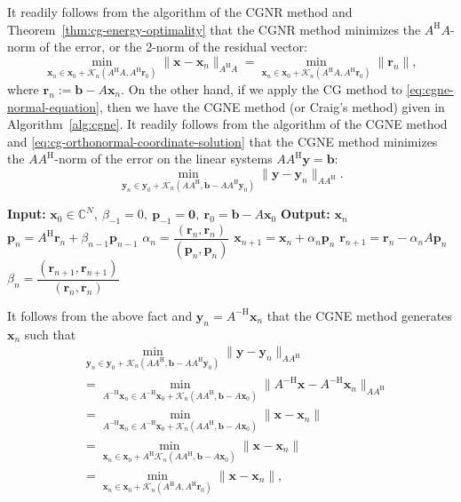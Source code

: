 {It readily follows from the algorithm of the CGNR method and Theorem\ \ref{thm:cg-energy-optimality} that the CGNR method minimizes the $A^{\mathrm H}A$-norm of the error, or the 2-norm of the residual vector:}
\[\min_{\bm x_n\in\bm x_0+\mathcal K_n(A^{\mathrm H}A,A^{\mathrm H}\bm r_0)}\|\bm x-\bm x_n\|_{A^{\mathrm H}A}=\min_{\bm x_n\in\bm x_0+\mathcal K_n(A^{\mathrm H}A,A^{\mathrm H}\bm r_0)}\|\bm r_n\|,\]
{where $\bm r_n:=\bm b-A\bm x_n$.}
{On the other hand, if we apply the CG method to \eqref{eq:cgne-normal-equation}, then we have the CGNE method  (or Craig's method) given in Algorithm\ \ref{alg:cgne}. It readily follows from the algorithm of the CGNE method and \eqref{eq:cg-orthonormal-coordinate-solution} that the CGNE method minimizes the $AA^{\mathrm H}$-norm of the error on the linear systems $AA^{\mathrm H}\bm y=\bm b$:}
\[\min_{\bm y_n\in\bm y_0+\mathcal K_n(AA^{\mathrm H},\bm b-AA^{\mathrm H}\bm y_0)}\|\bm y-\bm y_n\|_{AA^{\mathrm H}}.\]
\begin{algorithm}[H]\caption{{The CGNE method}}\label{alg:cgne}\begin{algorithmic}[1]
\Statex\textbf{Input:} $\bm x_0\in\mathbb C^N,\ \beta_{-1}=0,\ \bm p_{-1}=\bm0,\ \bm r_0=\bm b-A\bm x_0$
\Statex\textbf{Output:} $\bm x_n$
\State $\bm p_n=A^{\mathrm H}\bm r_n+\beta_{n-1}\bm p_{n-1}$
\State $\alpha_n=\dfrac{(\bm r_n,\bm r_n)}{(\bm p_n,\bm p_n)}$
\State $\bm x_{n+1}=\bm x_n+\alpha_n\bm p_n$
\State $\bm r_{n+1}=\bm r_n-\alpha_nA\bm p_n$
\State $\beta_n=\dfrac{(\bm r_{n+1},\bm r_{n+1})}{(\bm r_n,\bm r_n)}$
\EndFor\end{algorithmic}\end{algorithm}
{It follows from the above fact and $\bm y_n=A^{-\mathrm H}\bm x_n$ that the CGNE method generates $\bm x_n$ such that}
\[\begin{aligned}
&\min_{\bm y_n\in\bm y_0+\mathcal K_n(AA^{\mathrm H},\bm b-AA^{\mathrm H}\bm y_0)}\|\bm y-\bm y_n\|_{AA^{\mathrm H}}\\
&=\min_{A^{-\mathrm H}\bm x_n\in A^{-\mathrm H}\bm x_0+\mathcal K_n(AA^{\mathrm H},\bm b-A\bm x_0)}\|A^{-\mathrm H}\bm x-A^{-\mathrm H}\bm x_n\|_{AA^{\mathrm H}}\\
&=\min_{A^{-\mathrm H}\bm x_n\in A^{-\mathrm H}\bm x_0+\mathcal K_n(AA^{\mathrm H},\bm b-A\bm x_0)}\|\bm x-\bm x_n\|\\
&=\min_{\bm x_n\in\bm x_0+A^{\mathrm H}\mathcal K_n(AA^{\mathrm H},\bm b-A\bm x_0)}\|\bm x-\bm x_n\|\\
&=\min_{\bm x_n\in\bm x_0+\mathcal K_n(A^{\mathrm H}A,A^{\mathrm H}\bm r_0)}\|\bm x-\bm x_n\|,
\end{aligned}\]
